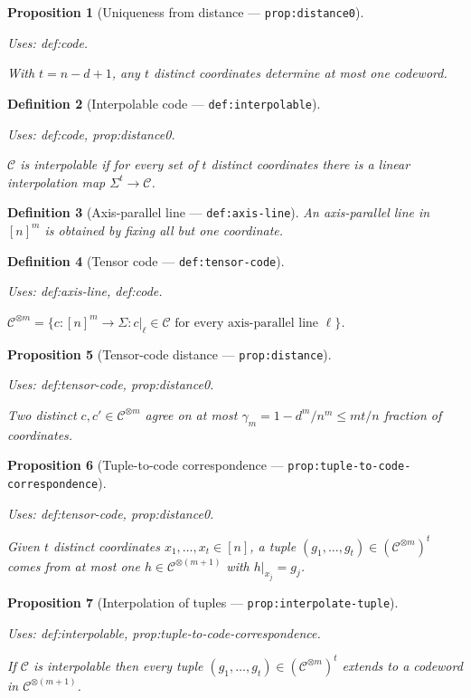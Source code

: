 \documentclass{article}
\providecommand{\uses}[1]{\par\smallskip\noindent\emph{Uses:} #1.\par\smallskip}
\newtheorem{definition}{Definition}[section]
\newtheorem{proposition}[definition]{Proposition}
\theoremstyle{remark}
\newcommand{\code}{\mathcal{C}}
\begin{document}
\begin{proposition}[Uniqueness from distance --- \texttt{prop:distance0}]
	\label{prop:distance0}
	\uses{def:code}
	With $t=n-d+1$, any $t$ distinct coordinates determine at most one codeword.
\end{proposition}

\begin{definition}[Interpolable code --- \texttt{def:interpolable}]\label{def:interpolable}
	\uses{def:code, prop:distance0}
	$\code$ is interpolable if for every set of $t$ distinct coordinates
	there is a \emph{linear} interpolation map $\Sigma^t\to\code$.
\end{definition}

\begin{definition}[Axis-parallel line --- \texttt{def:axis-line}]\label{def:axis-line}
	An axis-parallel line in $[n]^m$ is obtained by fixing all but one
	coordinate.
\end{definition}

\begin{definition}[Tensor code --- \texttt{def:tensor-code}]\label{def:tensor-code}
	\uses{def:axis-line, def:code}
	$\code^{\otimes m}=\{c\colon[n]^m\to\Sigma : c|_\ell\in\code\text{ for every
			axis-parallel line }\ell\}$.
\end{definition}

\begin{proposition}[Tensor-code distance --- \texttt{prop:distance}]\label{prop:distance}
	\uses{def:tensor-code, prop:distance0}
	Two distinct $c,c'\in\code^{\otimes m}$ agree on at most
	$\gamma_m=1-d^m/n^m\le mt/n$ fraction of coordinates.
\end{proposition}

\begin{proposition}[Tuple-to-code correspondence --- \texttt{prop:tuple-to-code-correspondence}]
	\label{prop:tuple-to-code-correspondence}
	\uses{def:tensor-code, prop:distance0}
	Given $t$ distinct coordinates $x_1,\dots,x_t\in[n]$, a tuple
	$(g_1,\dots,g_t)\in(\code^{\otimes m})^t$ comes from at most one
	$h\in\code^{\otimes(m+1)}$ with $h|_{x_j}=g_j$.
\end{proposition}

\begin{proposition}[Interpolation of tuples --- \texttt{prop:interpolate-tuple}]
	\label{prop:interpolate-tuple}
	\uses{def:interpolable, prop:tuple-to-code-correspondence}
	If $\code$ is interpolable then every tuple
	$(g_1,\dots,g_t)\in(\code^{\otimes m})^t$ extends to a codeword in
	$\code^{\otimes(m+1)}$.
\end{proposition}
\end{document}
